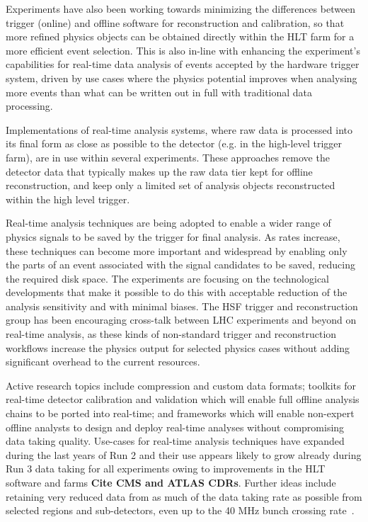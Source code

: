 Experiments have also been working towards minimizing the differences
between trigger (online) and offline software for reconstruction and
calibration, so that more refined physics objects can be obtained
directly within the HLT farm for a more efficient event selection. This
is also in-line with enhancing the experiment's capabilities for
real-time data analysis of events accepted by the hardware trigger
system, driven by use cases where the physics potential improves when
analysing more events than what can be written out in full with
traditional data processing.

Implementations of real-time analysis systems, where raw data is
processed into its final form as close as possible to the detector (e.g.
in the high-level trigger farm), are in use within several experiments.
These approaches remove the detector data that typically makes up the
raw data tier kept for offline reconstruction, and keep only a limited
set of analysis objects reconstructed within the high level trigger.

Real-time analysis techniques are being adopted to enable a wider range
of physics signals to be saved by the trigger for final analysis. As
rates increase, these techniques can become more important and
widespread by enabling only the parts of an event associated with the
signal candidates to be saved, reducing the required disk space. The
experiments are focusing on the technological developments that make it
possible to do this with acceptable reduction of the analysis
sensitivity and with minimal biases. The HSF trigger and reconstruction
group has been encouraging cross-talk between LHC experiments and beyond
on real-time analysis, as these kinds of non-standard trigger and
reconstruction workflows increase the physics output for selected
physics cases without adding significant overhead to the current
resources.

Active research topics include compression and custom data formats;
toolkits for real-time detector calibration and validation which will
enable full offline analysis chains to be ported into real-time; and
frameworks which will enable non-expert offline analysts to design and
deploy real-time analyses without compromising data taking quality.
Use-cases for real-time analysis techniques have expanded during the
last years of Run 2 and their use appears likely to
grow already during Run 3 data taking for all experiments owing to
improvements in the HLT software and farms \textbf{Cite CMS and ATLAS CDRs}. Further ideas include retaining very reduced data from as much
of the data taking rate as possible from selected regions and
sub-detectors, even up to the 40 MHz bunch crossing rate~\cite{hannes_sakulin_2019_3598769}.

